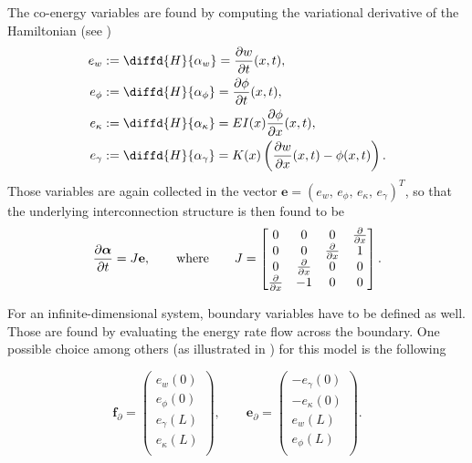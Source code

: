 \documentclass[preprint,12pt]{elsarticle}
\begin{document}
The co-energy variables are found by computing the variational derivative of the Hamiltonian (see  \cite{MacchelliTimo})
\begin{equation}
\begin{aligned}
e_{w} &:= \diffd{H}{\alpha_w} = \diffp{w}{t}(x,t), \\
e_{\phi} &:= \diffd{H}{\alpha_{\phi}} = \diffp{\phi}{t}(x,t), \\
e_{\kappa} &:= \diffd{H}{\alpha_{\kappa}} =EI(x) \diffp{\phi}{x}(x,t), \\
e_{\gamma} &:= \diffd{H}{\alpha_{\gamma}} = K(x) \left(\diffp{w}{x}(x,t) - \phi(x,t) \right). \\
\end{aligned}
\end{equation}
Those variables are again collected in the vector $\bm{e} = (e_{w}, \, e_{\phi}, \, e_{\kappa}, \, e_{\gamma} )^T $, so that the underlying interconnection structure is then found to be
\begin{equation}
\label{eq:PH_Timo}
\diffp{\bm{\alpha}}{t} = J \mathbf{e},  	\qquad \text{where} \qquad
J = 
\begin{bmatrix}
0 & 0 & 0 & \diffp{}{x} \\
0 & 0 & \diffp{}{x} & 1  \\
0 & \diffp{}{x} & 0 & 0 \\
\diffp{}{x} & -1 & 0 & 0 \\
\end{bmatrix} .
\end{equation}

For an infinite-dimensional system, boundary variables have to be defined as well. Those are found by evaluating the energy rate flow across the boundary. One possible choice among others (as illustrated in \cite{LeGorrec2005}) for this model is the following 

\begin{equation}
\bm{f}_{\partial} = 
\begin{pmatrix}
e_w(0) \\
e_{\phi}(0) \\
e_{\gamma}(L) \\
e_{\kappa}(L) \\
\end{pmatrix}, \qquad
\bm{e}_{\partial} = 
\begin{pmatrix}
-e_{\gamma}(0) \\
-e_{\kappa}(0) \\
e_{w}(L) \\
e_{\phi}(L) \\
\end{pmatrix}.
\end{equation}
\end{document}

